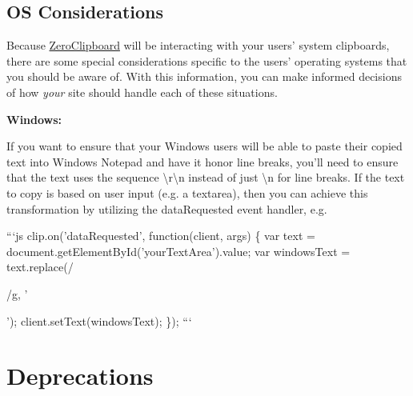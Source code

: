 \subsection*{O\-S Considerations}

Because \hyperlink{class_zero_clipboard}{Zero\-Clipboard} will be interacting with your users' system clipboards, there are some special considerations specific to the users' operating systems that you should be aware of. With this information, you can make informed decisions of how {\itshape your} site should handle each of these situations.


\begin{DoxyItemize}
\item {\bfseries Windows\-:}
\begin{DoxyItemize}
\item If you want to ensure that your Windows users will be able to paste their copied text into Windows Notepad and have it honor line breaks, you'll need to ensure that the text uses the sequence {\ttfamily \textbackslash{}r\textbackslash{}n} instead of just {\ttfamily \textbackslash{}n} for line breaks. If the text to copy is based on user input (e.\-g. a {\ttfamily textarea}), then you can achieve this transformation by utilizing the {\ttfamily data\-Requested} event handler, e.\-g.

```js clip.\-on('data\-Requested', function(client, args) \{ var text = document.\-get\-Element\-By\-Id('your\-Text\-Area').value; var windows\-Text = text.\-replace(/\par
/g, '\par
'); client.\-set\-Text(windows\-Text); \}); ```
\end{DoxyItemize}
\end{DoxyItemize}

\section*{Deprecations}

